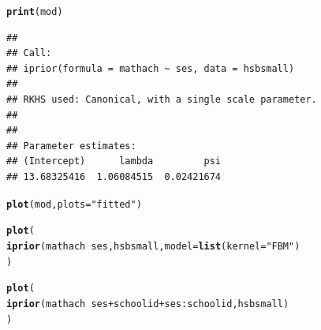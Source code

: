 \documentclass[]{beamer}\usepackage[]{graphicx}\usepackage[]{color}
\makeatletter
\newcommand{\hlstr}[1]{\textcolor[rgb]{0.192,0.494,0.8}{#1}}%
\newcommand{\hlopt}[1]{\textcolor[rgb]{0,0,0}{#1}}%
\newcommand{\hlstd}[1]{\textcolor[rgb]{0.345,0.345,0.345}{#1}}%
\newcommand{\hlkwc}[1]{\textcolor[rgb]{0.333,0.667,0.333}{#1}}%
\newcommand{\hlkwd}[1]{\textcolor[rgb]{0.737,0.353,0.396}{\textbf{#1}}}%
\newenvironment{kframe}{%
 \def\at@end@of@kframe{}%
 \ifinner\ifhmode%
  \def\at@end@of@kframe{\end{minipage}}%
  \begin{minipage}{\columnwidth}%
 \fi\fi%
 \def\FrameCommand##1{\hskip\@totalleftmargin \hskip-\fboxsep
 \colorbox{shadecolor}{##1}\hskip-\fboxsep
     \hskip-\linewidth \hskip-\@totalleftmargin \hskip\columnwidth}%
 \MakeFramed {\advance\hsize-\width
   \@totalleftmargin\z@ \linewidth\hsize
   \@setminipage}}%
 {\par\unskip\endMakeFramed%
 \at@end@of@kframe}
\newenvironment{knitrout}{}{} %
\makeatother
\begin{document}
\newsavebox{\ipriordemoc}
\begin{lrbox}{\ipriordemoc}
\begin{knitrout}\small
{}\color{fgcolor}\begin{kframe}
\begin{alltt}
\hlkwd{print}\hlstd{(mod)}
\end{alltt}
\begin{verbatim}
## 
## Call:
## iprior(formula = mathach ~ ses, data = hsbsmall)
## 
## RKHS used: Canonical, with a single scale parameter.
## 
## 
## Parameter estimates:
## (Intercept)      lambda         psi 
## 13.68325416  1.06084515  0.02421674
\end{verbatim}
\end{kframe}
\end{knitrout}
\end{lrbox}

\newsavebox{\ipriordemod}
\begin{lrbox}{\ipriordemod}
\begin{knitrout}\small
{}\color{fgcolor}\begin{kframe}
\begin{alltt}
\hlkwd{plot}\hlstd{(mod,} \hlkwc{plots} \hlstd{=} \hlstr{"fitted"}\hlstd{)}
\end{alltt}
\end{kframe}
\end{knitrout}
\end{lrbox}

\newsavebox{\ipriordemoe}
\begin{lrbox}{\ipriordemoe}
\begin{knitrout}\small
{}\color{fgcolor}\begin{kframe}
\begin{alltt}
\hlkwd{plot}(
  \hlkwd{iprior}(mathach ~ ses, hsbsmall, model = \hlkwd{list}(kernel = \hlstr{"FBM"})
)
\end{alltt}
\end{kframe}
\end{knitrout}
\end{lrbox}



\newsavebox{\ipriordemof}
\begin{lrbox}{\ipriordemof}
\begin{knitrout}\small
{}\color{fgcolor}\begin{kframe}
\begin{alltt}
\hlkwd{plot}\hlstd{(}
  \hlkwd{iprior}\hlstd{(mathach} \hlopt{~} \hlstd{ses} \hlopt{+} \hlstd{schoolid} \hlopt{+} \hlstd{ses}\hlopt{:}\hlstd{schoolid, hsbsmall)}
\hlstd{)}
\end{alltt}
\end{kframe}
\end{knitrout}
\end{lrbox}
\end{document}
